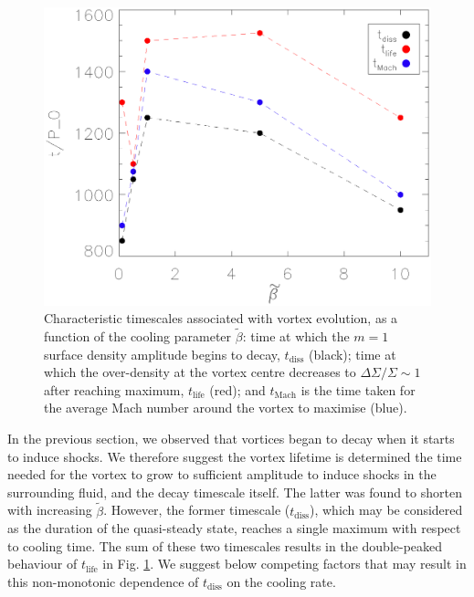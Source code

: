 \begin{figure}
  \includegraphics[width=\linewidth]{figures/betaplot}
  \caption{Characteristic timescales associated with vortex evolution, as a function of the cooling
    parameter $\tilde\beta$: time at which the $m=1$
    surface density amplitude begins to decay, $t_\mathrm{diss}$ (black);
    time at which the over-density at the
    vortex centre decreases to $\Delta\Sigma/\Sigma \sim 1$ after
    reaching maximum, $t_\mathrm{life}$ (red);
    and $t_\mathrm{Mach}$ is the time taken
    for the average Mach number around the vortex to maximise
    (blue). \label{betaplot}}  
\end{figure}

In the previous section, we observed that vortices began to decay when
it starts to induce shocks. We therefore suggest the vortex lifetime
is determined the time needed for the vortex to grow to 
sufficient amplitude to induce shocks in the surrounding fluid, and 
the decay timescale itself. The latter was found to shorten 
with increasing $\tilde{\beta}$. However, the former timescale
($t_\mathrm{diss}$), which may be considered as the 
duration of the quasi-steady state, reaches a single maximum with
respect to cooling time. The sum of these two timescales results in the
double-peaked behaviour of $t_\mathrm{life}$ in Fig. \ref{betaplot}. 
We suggest below competing factors that may result in this
non-monotonic dependence of $t_\mathrm{diss}$ on the cooling rate.  

